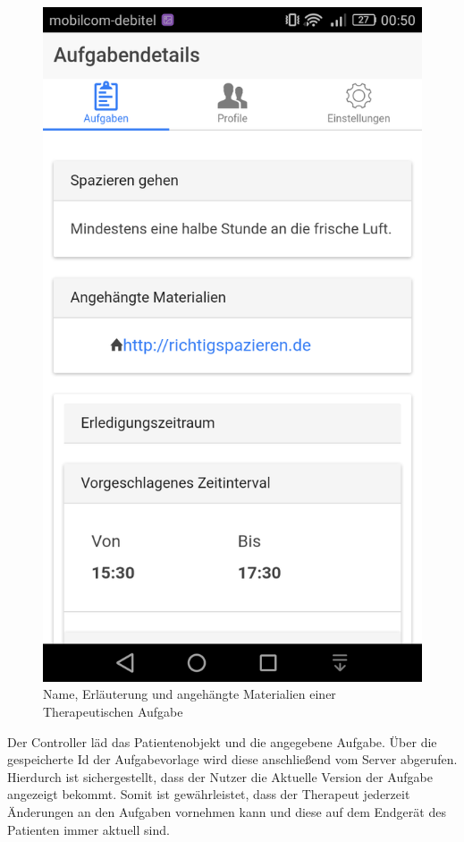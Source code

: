 \begin{figure}[H]
	\centering
	\includegraphics[scale=0.25]{images/Screenshots/PatientClient/Aufgabendetails}
	\caption[Name, Erläuterung und angehängte Materialien einer Therapeutischen Aufgabe]{Name, Erläuterung und angehängte Materialien einer Therapeutischen Aufgabe}
	\label{PatientClient_Aufgabendetails}
\end{figure}
Der Controller läd das Patientenobjekt und die angegebene Aufgabe. Über die gespeicherte Id der Aufgabevorlage wird diese anschließend vom Server abgerufen. Hierdurch ist sichergestellt, dass der Nutzer die Aktuelle Version der Aufgabe angezeigt bekommt. Somit ist gewährleistet, dass der Therapeut jederzeit Änderungen an den Aufgaben vornehmen kann und diese auf dem Endgerät des Patienten immer aktuell sind. 


